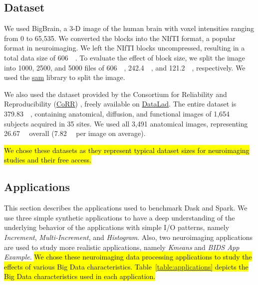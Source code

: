 \documentclass[AMA,STIX1COL]{WileyNJD-v2}
\newcommand{\HL}[1]{\hl{#1}}
\begin{document}
\subsection{Dataset}
We used BigBrain\cite{Amunts:13}, a 3-D image of the human brain with voxel
intensities ranging from 0 to 65,535. We converted the blocks into the
NIfTI format, a popular format in neuroimaging. We left the NIfTI blocks
uncompressed, resulting in a total data size of \SI{606}{\gibi\byte}. To
evaluate the effect of block size, we split the image into 1000, 2500,
and 5000 files of \SI{606}{\mebi\byte}, \SI{242.4}{\mebi\byte}, and
\SI{121.2}{\mebi\byte}, respectively.
We used the \href{https://github.com/big-data-lab-team/sam}{sam} library to split the image.
							
We also used the dataset provided by the Consortium for Reliability and
Reproducibility
(\href{http://fcon_1000.projects.nitrc.org/indi/CoRR/html/}{CoRR})
\cite{zuo2014open}, freely available on
\href{https://datasets.datalad.org/?dir=/corr/RawDataBIDS}{DataLad}.
The entire dataset is \SI{379.83}{\gibi\byte}, containing anatomical, diffusion,
and functional images of 1,654 subjects acquired in 35 sites.
We used all 3,491 anatomical images, representing \SI{26.67}{\gibi\byte} overall
(\SI{7.82}{\mebi\byte} per image on average).

\HL{
	We chose these datasets as they represent typical dataset sizes for neuroimaging studies and their free access.
}
							
\subsection{Applications}
This section describes the applications used to benchmark Dask and Spark.
We use three simple synthetic applications to have a deep understanding of the 
underlying behavior of the applications with simple I/O patterns, namely
\textit{Increment}, \textit{Multi-Increment}, and \textit{Histogram}.
Also, two neuroimaging applications are used to study more realistic 
applications, namely \textit{Kmeans} and \textit{BIDS App Example}{\cite{gorgolewski2017bids}}.
\HL{
	We chose these neuroimaging data processing applications to study the 
	effects of various Big Data characteristics.
	Table~{\ref{table:applications}} depicts the Big Data characteristics used in
	each application.
}
\end{document}
